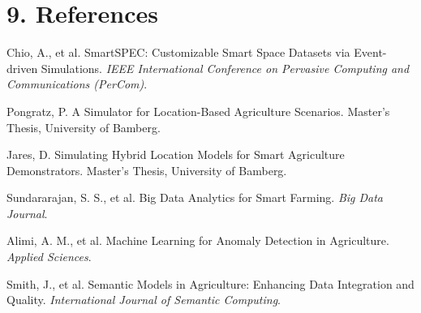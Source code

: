 \documentclass[11pt]{article}
\begin{document}
\section*{9. References}
\begin{thebibliography}{9}
 Chio, A., et al. SmartSPEC: Customizable Smart Space Datasets via Event-driven Simulations. \textit{IEEE International Conference on Pervasive Computing and Communications (PerCom)}.

 Pongratz, P. A Simulator for Location-Based Agriculture Scenarios. Master's Thesis, University of Bamberg.

 Jares, D. Simulating Hybrid Location Models for Smart Agriculture Demonstrators. Master's Thesis, University of Bamberg.

 Sundararajan, S. S., et al. Big Data Analytics for Smart Farming. \textit{Big Data Journal}.

 Alimi, A. M., et al. Machine Learning for Anomaly Detection in Agriculture. \textit{Applied Sciences}.

 Smith, J., et al. Semantic Models in Agriculture: Enhancing Data Integration and Quality. \textit{International Journal of Semantic Computing}.
\end{thebibliography}



\newpage
\appendix
\end{document}
